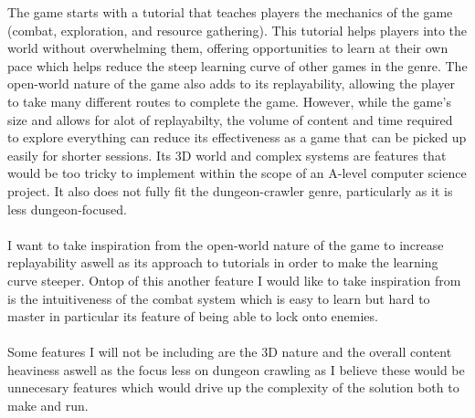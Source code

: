 \documentclass{article}
\begin{document}
        The game starts with a tutorial that teaches players the mechanics of the game (combat, exploration, and resource gathering). This tutorial helps players into the world without overwhelming them, offering opportunities to learn at their own pace which helps reduce the steep learning curve of other games in the genre. The open-world nature of the game also adds to its replayability, allowing the player to take many different routes to complete the game. However, while the game’s size and allows for alot of replayabilty, the volume of content and time required to explore everything can reduce its effectiveness as a game that can be picked up easily for shorter sessions. Its 3D world and complex systems are features that would be too tricky to implement within the scope of an A-level computer science project. It also does not fully fit the dungeon-crawler genre, particularly as it is less dungeon-focused.\\ 
        \\
        I want to take inspiration from the open-world nature of the game to increase replayability aswell as its approach to tutorials in order to make the learning curve steeper. Ontop of this another feature I would like to take inspiration from is the intuitiveness of the combat system which is easy to learn but hard to master in particular its feature of being able to lock onto enemies.\\
        \\
        Some features I will not be including are the 3D nature and the overall content heaviness aswell as the focus less on dungeon crawling as I believe these would be unnecesary features which would drive up the complexity of the solution both to make and run.\\
        \\
        \newpage
        \[\]   
\end{document}
